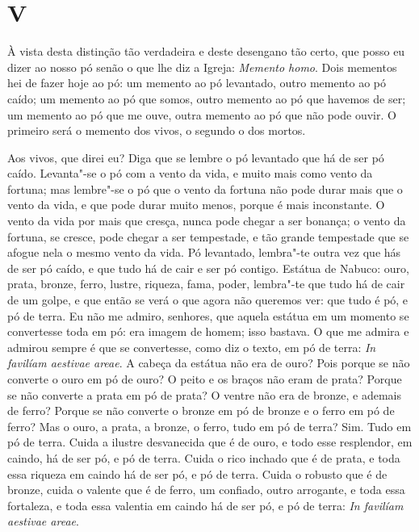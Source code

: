 \section{V}

À vista desta distinção tão verdadeira e deste desengano tão certo, que
posso eu dizer ao nosso pó senão o que lhe diz a Igreja: \emph{Memento
homo}. Dois mementos hei de fazer hoje ao pó: um memento ao pó
levantado, outro memento ao pó caído; um memento ao pó que somos, outro
memento ao pó que havemos de ser; um memento ao pó que me ouve, outra
memento ao pó que não pode ouvir. O primeiro será o memento dos vivos, o
segundo o dos mortos.

Aos vivos, que direi eu? Diga que se lembre o pó levantado que há de ser
pó caído. Levanta"-se o pó com a vento da vida, e muito
mais como vento da fortuna; mas lembre"-se o pó que o vento da fortuna
não pode durar mais que o vento da vida, e que pode durar muito menos,
porque é mais inconstante. O vento da vida por mais que cresça, nunca
pode chegar a ser bonança; o vento da fortuna, se
cresce, pode chegar a ser tempestade, e tão grande tempestade que se
afogue nela o mesmo vento da vida. Pó levantado, lembra"-te outra vez que
hás de ser pó caído, e que tudo há de cair e ser pó contigo. Estátua de
Nabuco: ouro, prata, bronze, ferro, lustre, riqueza, fama, poder,
lembra"-te que tudo há de cair de um golpe, e que então se verá o que
agora não queremos ver: que tudo é pó, e pó de terra. Eu não me admiro,
senhores, que aquela estátua em um momento se convertesse toda em pó:
era imagem de homem; isso bastava. O que me admira e admirou sempre é
que se convertesse, como diz o texto, em pó de terra: \emph{In favilíam
aestivae areae}. A cabeça da estátua não era de ouro? Pois %
porque se não converte o ouro em pó de ouro? O peito e os braços não
eram de prata? Porque se não converte a prata em pó de prata? O ventre
não era de bronze, e ademais de ferro? Porque se não converte o bronze
em pó de bronze e o ferro em pó de ferro? Mas o ouro, a prata, a bronze,
o ferro, tudo em pó de terra? Sim. Tudo em pó de terra. Cuida a ilustre
desvanecida que é de ouro, e todo esse resplendor, em caindo, há de ser
pó, e pó de terra. Cuida o rico inchado que é de prata, e toda essa
riqueza em caindo há de ser pó, e pó de terra. Cuida o robusto que é de
bronze, cuida o valente que é de ferro, um confiado, outro arrogante, e
toda essa fortaleza, e toda essa valentia em caindo há de ser pó, e pó
de terra: \emph{In favilíam aestivae areae}.

